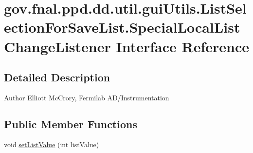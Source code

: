 \hypertarget{interfacegov_1_1fnal_1_1ppd_1_1dd_1_1util_1_1guiUtils_1_1ListSelectionForSaveList_1_1SpecialLocalListChangeListener}{\section{gov.\-fnal.\-ppd.\-dd.\-util.\-gui\-Utils.\-List\-Selection\-For\-Save\-List.\-Special\-Local\-List\-Change\-Listener Interface Reference}
\label{interfacegov_1_1fnal_1_1ppd_1_1dd_1_1util_1_1guiUtils_1_1ListSelectionForSaveList_1_1SpecialLocalListChangeListener}
}


\subsection{Detailed Description}
\begin{DoxyAuthor}{Author}
Elliott Mc\-Crory, Fermilab A\-D/\-Instrumentation 
\end{DoxyAuthor}
\subsection*{Public Member Functions}
\begin{DoxyCompactItemize}
\item 
void \hyperlink{interfacegov_1_1fnal_1_1ppd_1_1dd_1_1util_1_1guiUtils_1_1ListSelectionForSaveList_1_1SpecialLocalListChangeListener_a94ad3a65d2ec7599e939ff272c126465}{set\-List\-Value} (int list\-Value)
\end{DoxyCompactItemize}


